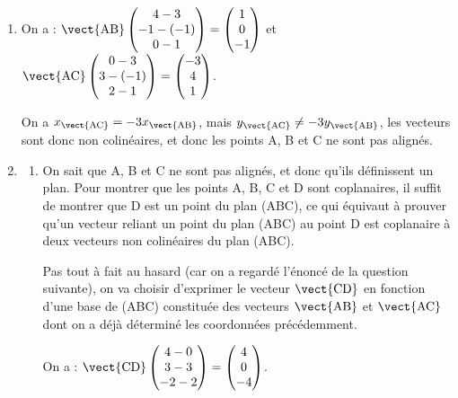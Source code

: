 \medskip

\begin{enumerate}
\item On a : \quad $\vect{\mathrm{AB}}\begin{pmatrix} 4 - 3\\ -1 - (-1) \\ 0-1\end{pmatrix} = \begin{pmatrix}1\\0\\-1\end{pmatrix}$ \quad et \quad $\vect{\mathrm{AC}}\begin{pmatrix} 0 - 3\\ 3 - (-1) \\ 2-1\end{pmatrix} = \begin{pmatrix}-3\\4\\1\end{pmatrix}$.

On a $x_{\vect{\mathrm{AC}}} = -3 x_{\vect{\mathrm{AB}}}$, mais $y_{\vect{\mathrm{AC}}} \neq -3 y_{\vect{\mathrm{AB}}}$, les vecteurs sont donc non colinéaires, et donc les points A, B et C ne sont pas alignés.

\item
	\begin{enumerate}
		\item On sait que A, B et C ne sont pas alignés, et donc qu'ils définissent un plan. Pour montrer que les points A, B, C et D sont coplanaires, il suffit de montrer que D est un point du plan (ABC), ce qui équivaut à prouver qu'un vecteur reliant un point du plan (ABC) au point D est coplanaire à deux vecteurs non colinéaires du plan (ABC).

		Pas tout à fait au hasard (car on a regardé l'énoncé de la question suivante), on va choisir d'exprimer le vecteur $\vect{\mathrm{CD}}$ en fonction d'une base de (ABC) constituée des vecteurs $\vect{\mathrm{AB}}$ et $\vect{\mathrm{AC}}$ dont on a déjà déterminé les coordonnées précédemment.

		On a : \quad $\vect{\mathrm{CD}}\begin{pmatrix}4 - 0\\3 - 3\\-2 - 2\end{pmatrix} = \begin{pmatrix}4\\0\\-4\end{pmatrix}$.


\end{enumerate}
\end{enumerate}
